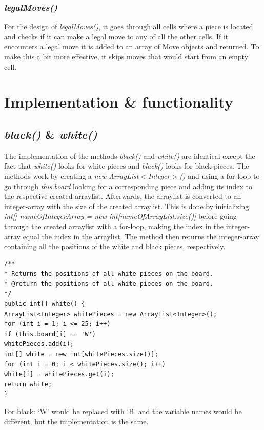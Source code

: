 \documentclass[12pt, a4paper]{article}
\begin{document}
\subsubsection{\emph{legalMoves()}}
For the design of \emph{legalMoves()}, it goes through all cells where a piece is located and checks if it can make a legal move to any of all the other cells. If it encounters a legal move it is added to an array of Move objects and returned. To make this a bit more effective, it skips moves that would start from an empty cell.

\section{Implementation \& functionality}

\subsection{\emph{black()} \& \emph{white()}}
The implementation of the methods \emph{black()} and \emph{white()} are identical except the fact that \emph{white()} looks for white pieces and \emph{black()} looks for black pieces. The methods work by creating a \emph{new ArrayList$<$Integer$>$()} and using a for-loop to go through \emph{this.board} looking for a corresponding piece and adding its index to the respective created arraylist. Afterwards, the arraylist is converted to an integer-array with the size of the created arraylist. This is done by initializing \emph{int[] nameOfIntegerArray = new int[nameOfArrayList.size()]} before going through the created arraylist with a for-loop, making the index in the integer-array equal the index in the arraylist. The method then returns the integer-array containing all the positions of the white and black pieces, respectively.

\begin{lstlisting}[style=JavaStyle]
/**
* Returns the positions of all white pieces on the board.
* @return the positions of all white pieces on the board.
*/
public int[] white() {
ArrayList<Integer> whitePieces = new ArrayList<Integer>();
for (int i = 1; i <= 25; i++)
if (this.board[i] == 'W')
whitePieces.add(i);
int[] white = new int[whitePieces.size()];
for (int i = 0; i < whitePieces.size(); i++)
white[i] = whitePieces.get(i);
return white;
}
\end{lstlisting}

For black: ‘W’ would be replaced with ‘B’ and the variable names would be different, but the implementation is the same.
\end{document}
